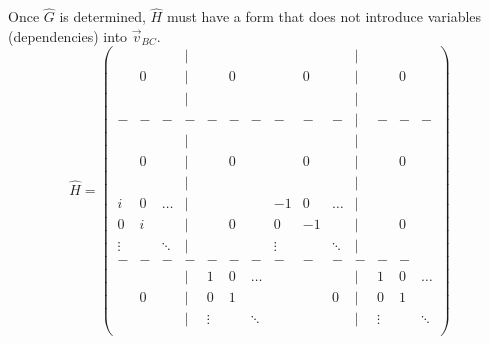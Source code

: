 Once $\hat{G}$ is determined,  $\hat{H}$ must have a form that does not introduce variables
(dependencies) into $\vec{v}_{BC}$.
\begin{equation}
\hat{H} =
\left( \begin{array}{ccccccc|ccccccc}
       &       &        & | &        &        &        &        &     &        & | &        &    &        \\
       &   0   &        & | &        &   0    &        &        &  0  &        & | &        &  0 &        \\
       &       &        & | &        &        &        &        &     &        & | &        &    &        \\
  -    &   -   &   -    & - &    -   &    -   &   -    &   -    &  -  &  -     & | &   -    & -  &   -    \\
       &       &        & | &        &        &        &        &     &        & | &        &    &        \\
       &   0   &        & | &        &   0    &        &        &  0  &        & | &        &  0 &        \\
       &       &        & | &        &        &        &        &     &        & | &        &    &        \\
\hline
  i    &   0   & \ldots & | &        &        &        &    -1  &  0  & \ldots & | &        &    &        \\
  0    &   i   &        & | &        &   0    &        &     0  & -1  &        & | &        &  0 &        \\
\vdots &       & \ddots & | &        &        &        & \vdots &     & \ddots & | &        &    &        \\ 
  -    &   -   &   -    & - &   -    &   -    &   -    &    -   &  -  &   -    & - &   -    & -  &        \\
       &       &        & | &    1   &   0    & \ldots &        &     &        & | &    1   &  0 & \ldots \\
       &   0   &        & | &    0   &   1    &        &        &     &   0    & | &   0    &  1 &        \\
       &       &        & | & \vdots &        & \ddots &        &     &        & | & \vdots &    & \ddots \\
       \end{array} \right)
\label{Hmatrix}
\end{equation}

